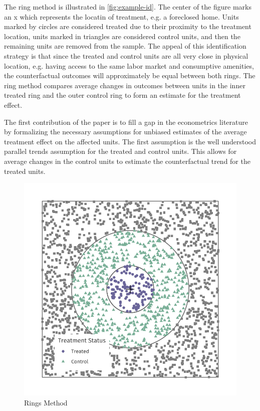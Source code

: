 \documentclass[10pt]{article}
\begin{document}
The ring method is illustrated in \autoref{fig:example-id}. The center of the figure marks an x which represents the locatin of treatment, e.g. a foreclosed home. Units marked by circles are considered treated due to their proximity to the treatment location, units marked in triangles are considered control units, and then the remaining units are removed from the sample. The appeal of this identification strategy is that since the treated and control units are all very close in physical location, e.g. having access to the same labor market and consumptive amenities, the counterfactual outcomes will approximately be equal between both rings. The ring method compares average changes in outcomes between units in the inner treated ring and the outer control ring to form an estimate for the treatment effect. 

The first contribution of the paper is to fill a gap in the econometrics literature by formalizing the necessary assumptions for unbiased estimates of the average treatment effect on the affected units. The first assumption is the well understood parallel trends assumption for the treated and control units. This allows for average changes in the control units to estimate the counterfactual trend for the treated units.


\begin{figure}[tb]
    \caption{Rings Method}
    \label{fig:example-id}

    \begin{adjustbox}{width = 0.4\textwidth, center}
        \includegraphics[width=\textwidth]{../../figures/example_id.pdf}
    \end{adjustbox}
\end{figure}
\end{document}

